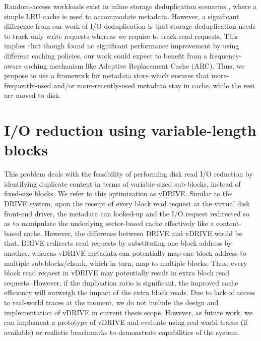 Random-access workloads exist in inline storage deduplication scenarios
\cite{idedup}, where a simple LRU cache is used to accommodate metadata.
However, a significant difference from our work
of I/O deduplication is that storage deduplication needs to track only
write requests whereas we require to track read requests.
This implies that though \cite{idedup} found no significant performance
improvement by using different caching policies, our work
could expect to benefit from a frequency-aware caching mechanism like
Adaptive Replacement Cache (ARC).
Thus, we propose to use a framework for metadata store which
ensures that more-frequently-used and/or more-recently-used
metadata stay in cache, while the rest are moved to disk.

\section{I/O reduction using variable-length blocks}
This problem deals with the feasibility of performing disk
read I/O reduction by identifying duplicate content in terms of
variable-sized sub-blocks, instead of fixed-size blocks.
We refer to this optimization as vDRIVE.
Similar to the DRIVE system, upon the receipt 
of every block read request at the virtual disk front-end driver, 
the metadata can looked-up and the I/O
request redirected so as to manipulate the underlying 
sector-based cache effectively like a content-based cache. 
However, the difference between DRIVE and vDRIVE would be that, DRIVE
redirects read requests by substituting one block address by 
another, whereas vDRIVE metadata can potentially map one block
address to multiple sub-blocks/chunk, which in turn, map to multiple blocks.
Thus, every block read request in vDRIVE may potentially result
in extra block read requests. However, if the duplication ratio
is significant, the improved cache efficiency will outweigh the
impact of the extra block reads.
Due to lack of access to real-world traces at the moment, we
do not include the design and implementation of vDRIVE in current
thesis scope.
However, as future work, we can implement a prototype of vDRIVE
and evaluate using real-world traces (if available) or
realistic benchmarks to demonstrate capabilities of the system.


